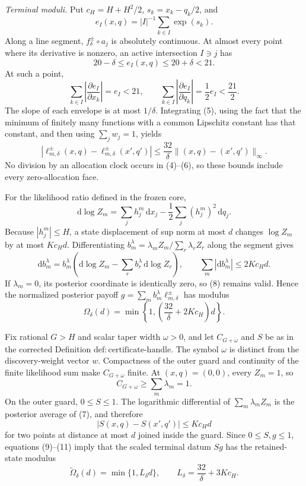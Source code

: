 \emph{Terminal moduli.}
Put \(c_H=H+H^2/2\), \(s_k=x_k-q_k/2\), and
\[
 e_I(x,q)=|I|^{-1}\sum_{k\in I}\exp(s_k).
\]
Along a line segment, \(f_\delta^\pm\circ a_j\) is absolutely continuous.  At almost every point where its derivative is nonzero, an active intersection \(I\ni j\) has
\[
 20-\delta\leq e_I(x,q)\leq20+\delta<21.
 \tag{4}
\]
At such a point,
\[
 \sum_{k\in I}\left|\frac{\partial e_I}{\partial x_k}\right|=e_I<21,
 \qquad
 \sum_{k\in I}\left|\frac{\partial e_I}{\partial q_k}\right|=\frac12e_I<\frac{21}{2}.
 \tag{5}
\]
The slope of each envelope is at most \(1/\delta\).  Integrating (5), using the fact that the minimum of finitely many functions with a common Lipschitz constant has that constant, and then using \(\sum_jw_j=1\), yields
\[
 |\ell_{m,\delta}^\pm(x,q)-\ell_{m,\delta}^\pm(x',q')|
 \leq\frac{32}{\delta}\|(x,q)-(x',q')\|_\infty.
 \tag{6}
\]
No division by an allocation clock occurs in (4)--(6), so these bounds include every zero-allocation face.

For the likelihood ratio defined in the frozen core,
\[
 \mathrm d\log Z_m
 =\sum_jh_j^m\,\mathrm dx_j-\frac12\sum_j(h_j^m)^2\,\mathrm dq_j.
 \tag{7}
\]
Because \(|h_j^m|\leq H\), a state displacement of sup norm at most \(d\) changes \(\log Z_m\) by at most \(Kc_Hd\).  Differentiating
\(b_m^\lambda=\lambda_mZ_m/\sum_r\lambda_rZ_r\) along the segment gives
\[
 \mathrm db_m^\lambda=b_m^\lambda\left(\mathrm d\log Z_m-
 \sum_rb_r^\lambda\,\mathrm d\log Z_r\right),
 \qquad
 \sum_m|\mathrm db_m^\lambda|\leq2Kc_Hd.
 \tag{8}
\]
If \(\lambda_m=0\), its posterior coordinate is identically zero, so (8) remains valid.  Hence the normalized posterior payoff
\(g=\sum_mb_m^\lambda\ell_{m,\delta}^\pm\) has modulus
\[
 \Omega_\delta(d)=
 \min\!\left\{1,\left(\frac{32}{\delta}+2Kc_H\right)d\right\}.
 \tag{9}
\]

Fix rational \(G>H\) and scalar taper width \(\omega>0\), and let \(C_{G+\omega}\) and \(S\) be as in the corrected Definition \(\mathrm{def{:}certificate\text{-}handle}\).  The symbol \(\omega\) is distinct from the discovery-weight vector \(w\).  Compactness of the outer guard and continuity of the finite likelihood sum make \(C_{G+\omega}\) finite.  At \((x,q)=(0,0)\), every \(Z_m=1\), so
\[
 C_{G+\omega}\geq\sum_m\lambda_m=1.
 \tag{10}
\]
On the outer guard, \(0\leq S\leq1\).  The logarithmic differential of \(\sum_m\lambda_mZ_m\) is the posterior average of (7), and therefore
\[
 |S(x,q)-S(x',q')|\leq Kc_Hd
 \tag{11}
\]
for two points at distance at most \(d\) joined inside the guard.  Since \(0\leq S,g\leq1\), equations (9)--(11) imply that the scaled terminal datum \(Sg\) has the retained-state modulus
\[
 \widetilde\Omega_\delta(d)=\min\{1,L_\delta d\},
 \qquad L_\delta=\frac{32}{\delta}+3Kc_H.
 \tag{12}
\]

